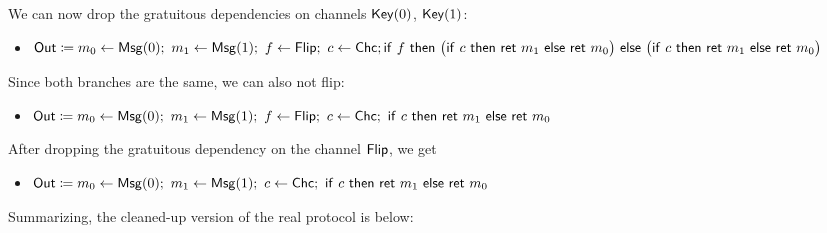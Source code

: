 We can now drop the gratuitous dependencies on channels $\mathsf{Key}(0)$, $\mathsf{Key}(1)$:
\begin{itemize}
\item $\mathsf{Out} \coloneqq m_0 \leftarrow \mathsf{Msg}(0); \ m_1 \leftarrow \mathsf{Msg}(1); \ f \leftarrow \mathsf{Flip}; \ c \leftarrow \mathsf{Chc}; \\ \mathsf{if} \ f \ \mathsf{then} \ \big(\mathsf{if} \ c \ \mathsf{then} \ \mathsf{ret} \ m_1 \ \mathsf{else} \ \mathsf{ret} \ m_0\big) \ \mathsf{else} \ \big(\mathsf{if} \ c \ \mathsf{then} \ \mathsf{ret} \ m_1 \ \mathsf{else} \ \mathsf{ret} \ m_0\big)$
\end{itemize}
Since both branches are the same, we can also not flip:
\begin{itemize}
\item $\Out \coloneqq m_0 \leftarrow \Msg(0); \ m_1 \leftarrow \Msg(1); \ f \leftarrow \Flip; \ c \leftarrow \Chc; \ \ifte{c}{\ret{m_1}}{\ret{m_0}}$
\end{itemize}
After dropping the gratuitous dependency on the channel $\mathsf{Flip}$, we get
\begin{itemize}
\item $\Out \coloneqq m_0 \leftarrow \Msg(0); \ m_1 \leftarrow \Msg(1); \ c \leftarrow \Chc; \ \ifte{c}{\ret{m_1}}{\ret{m_0}}$
\end{itemize}
Summarizing, the cleaned-up version of the real protocol is below:


